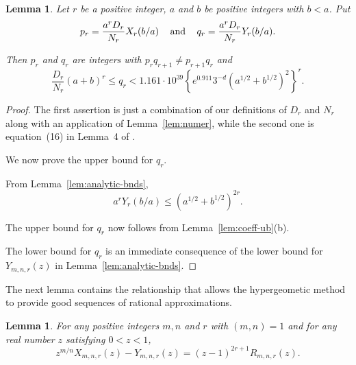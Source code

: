 \documentclass{jT}
\newtheorem{lemma}[theorem]{Lemma}
\theoremstyle{definition}
\begin{document}
\begin{lemma} 
\label{lem:pq-ub}
Let $r$ be a positive integer, $a$ and $b$ be positive integers with $b < a$. Put  
\begin{displaymath}
p_{r} = \frac{a^{r} D_{r}}{N_{r}} X_{r}(b/a) 
\hspace{3.0mm} \mbox{ and } \hspace{3.0mm} 
q_{r} = \frac{a^{r} D_{r}}{N_{r}} Y_{r}(b/a). 
\end{displaymath}

Then $p_{r}$ and $q_{r}$ are integers with 
$p_{r}q_{r+1} \neq p_{r+1}q_{r}$ and 
\begin{equation}
\label{eq:qest}
\frac{D_{r}}{N_{r}} (a+b)^{r} \leq q_{r} 
< 1.161 \cdot 10^{39} { \left\{ e^{0.911} 3^{-d} 
		     { \left( a^{1/2} + b^{1/2} \right) }^{2} 
		     \right\} }^{r}. 
\end{equation}
\end{lemma}

\begin{proof}
The first assertion is just a combination of our definitions 
of $D_{r}$ and $N_{r}$ along with an application of 
Lemma~\ref{lem:numer}, while the second one is equation~(16) 
in Lemma~4 of \cite{Baker2}. 

We now prove the upper bound for $q_{r}$.

From Lemma~\ref{lem:analytic-bnds},
\begin{displaymath}
a^{r} Y_{r}(b/a) \leq { \left( a^{1/2} + b^{1/2} \right) }^{2r}.
\end{displaymath}

The upper bound for $q_{r}$ now follows from Lemma~\ref{lem:coeff-ub}(b). 

The lower bound for $q_{r}$ is an immediate consequence of the 
lower bound for $Y_{m,n,r}(z)$ in Lemma~\ref{lem:analytic-bnds}.
\end{proof}

The next lemma contains the relationship that allows the hypergeometic method to provide
good sequences of rational approximations.

\begin{lemma}
\label{lem:relation}
For any positive integers $m,n$ and $r$ with $(m,n)=1$ 
and for any real number $z$ satisfying $0 < z < 1$, 
\begin{equation}
\label{eq:approx}
z^{m/n} X_{m,n,r}(z) - Y_{m,n,r}(z) = (z-1)^{2r+1} R_{m,n,r}(z). 
\end{equation}
\end{lemma}
\end{document}
